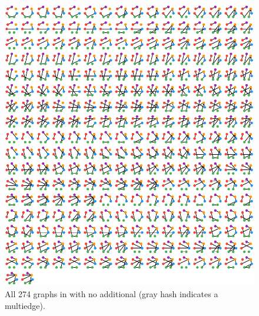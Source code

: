 \begin{figure}[p]
\includegraphics[width=\textwidth]{../app2/figures/ex2_allgraphs-reduced}
\caption{All 274 graphs in  with no additional  (gray hash indicates a multiedge).\label{fig:appB:example2}}
\end{figure}